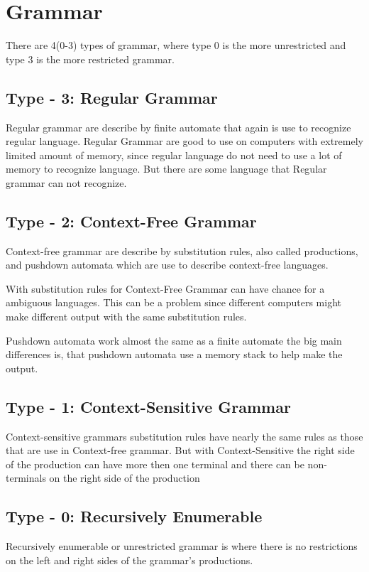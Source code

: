 \section{Grammar}
There are 4(0-3) types of grammar, where type 0 is the more unrestricted and type 3 is the more restricted grammar.

\subsection{Type - 3: Regular Grammar}
Regular grammar are describe by finite automate that again is use to recognize regular language. Regular Grammar are good to use on computers with extremely limited amount of memory, since regular language do not need to use a lot of memory to recognize language. But there are some language that Regular grammar can not recognize.

\subsection{Type - 2: Context-Free Grammar}
Context-free grammar are describe by substitution rules, also called productions, and pushdown automata which are use to describe context-free languages.

With substitution rules for Context-Free Grammar can have chance for a ambiguous languages.
This can be a problem since different computers might make different output with the same substitution rules.

Pushdown automata work almost the same as a finite automate the big main differences is, that pushdown automata use a memory stack to help make the output.

\subsection{Type - 1: Context-Sensitive Grammar}
Context-sensitive grammars substitution rules have nearly the same rules as those that are use in Context-free grammar.
But with Context-Sensitive the right side of the production can have more then one terminal and there can be non-terminals on the right side of the production

\subsection{Type - 0: Recursively Enumerable}
Recursively enumerable or unrestricted grammar is where there is no restrictions on the left and right sides of the grammar's productions.
